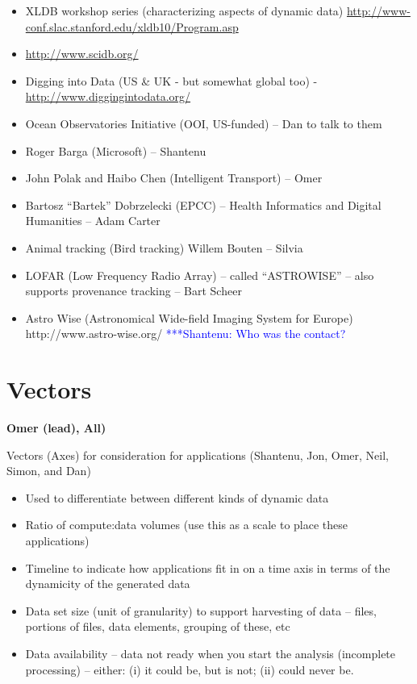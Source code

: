 \documentclass[preprint,12pt]{article}
\newcommand{\jhanote}[1]{  {\textcolor{blue}     { ***Shantenu: #1 }}}
\newcommand{\jhanote}[1]{}
\begin{document}
\begin{itemize}
\item XLDB workshop series (characterizing aspects of dynamic data)
\url{http://www-conf.slac.stanford.edu/xldb10/Program.asp}
\item \url{http://www.scidb.org/}
\item Digging into Data (US \& UK - but somewhat global too) -
   \url{http://www.diggingintodata.org/}
\item Ocean Observatories Initiative (OOI, US-funded) -- Dan to talk to them
\item Roger Barga (Microsoft) -- Shantenu
\item John Polak and Haibo Chen (Intelligent Transport) -- Omer
\item Bartosz ``Bartek'' Dobrzelecki (EPCC) -- Health Informatics and Digital Humanities -- Adam Carter
\item Animal tracking (Bird tracking)  Willem Bouten -- Silvia
\item LOFAR (Low Frequency Radio Array) -- called ``ASTROWISE''  -- also
  supports provenance  tracking -- Bart Scheer
\item Astro Wise (Astronomical Wide-field Imaging System for Europe)
  http://www.astro-wise.org/ \jhanote{Who was the contact?}
\end{itemize}

\section{Vectors} {\bf Omer (lead), All)}

Vectors (Axes) for consideration for applications  (Shantenu, Jon, Omer, Neil, Simon, and Dan)
\begin{itemize}
\item  Used to differentiate between different kinds of dynamic data
\item Ratio of compute:data volumes (use this as a scale to place these applications)
\item Timeline to indicate how applications fit in on a time axis in terms of the dynamicity of the generated data
\item Data set size (unit of granularity) to support harvesting of data -- files, portions of files, data elements, grouping of these, etc
\item Data availability -- data not ready when you start the analysis (incomplete processing) -- either: (i) it could be, but is not; (ii) could never be.
\end{itemize}
\end{document}
